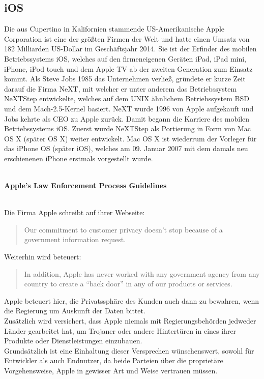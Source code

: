 \subsection{iOS}
	Die aus Cupertino in Kalifornien stammende US-Amerikanische Apple Corporation
	ist eine der größten Firmen der Welt und hatte einen Umsatz von 182 Milliarden
	US-Dollar im Geschäftsjahr 2014. Sie ist der Erfinder des mobilen
	Betriebssystems iOS, welches auf den firmeneigenen Geräten iPad, iPad mini,
	iPhone, iPod touch und dem Apple TV ab der zweiten Generation zum Einsatz
	kommt. Als Steve Jobs 1985 das Unternehmen verließ, gründete er
	kurze Zeit darauf die Firma NeXT, mit welcher er unter anderem das
	Betriebssystem NeXTStep entwickelte, welches auf dem UNIX ähnlichem
	Betriebssystem BSD\cite[S.12]{Tanenbaum2009} und dem
	Mach-2.5-Kernel\cite{MachProject2015} basiert. NeXT wurde 1996 von Apple
	aufgekauft und Jobs kehrte als CEO zu Apple zurück. Damit begann die Karriere
	des mobilen Betriebssystems iOS. Zuerst wurde NeXTStep als Portierung in Form
	von Mac OS X (später OS X) weiter entwickelt. Mac OS X ist wiederrum der
	Vorleger für das iPhone OS (später iOS), welches am 09. Januar 2007 mit dem
	damals neu erschienenen iPhone erstmals vorgestellt wurde.
	\\\\
	\centerline{\textbf{Apple's Law Enforcement Process Guidelines}}
	\\
	Die Firma Apple schreibt auf ihrer Webseite:
	\begin{quote}
		Our commitment to customer privacy doesn't stop because of a government
		information request.\cite{AppleGovInfo2015}
	\end{quote}
	Weiterhin wird beteuert:
	\begin{quote}
		In addition, Apple has never worked with any government agency from any
		country to create a "`back door"' in any of our products or
		services.\cite{AppleGovInfo2015}
	\end{quote}
	Apple beteuert hier, die Privatssphäre des Kunden auch dann zu bewahren,
	wenn die Regierung um Auskunft der Daten bittet.\\
	Zusätzlich wird versichert, dass Apple niemals mit Regierungsbehörden
	jedweder Länder gearbeitet hat, um Trojaner oder andere Hintertüren in eines
	ihrer Produkte oder Dienstleistungen einzubauen.\\
	Grundsätzlich ist eine Einhaltung dieser Versprechen wünschenswert, sowohl für
	Entwickler als auch Endnutzer, da beide Parteien über die proprietäre
	Vorgehensweise, Apple in gewisser Art und Weise vertrauen müssen.
